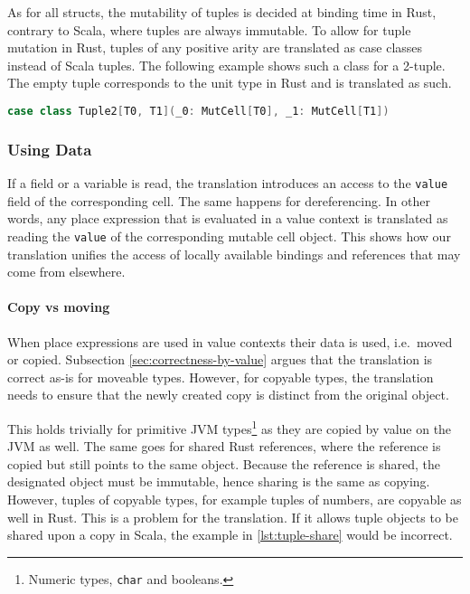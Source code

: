 As for all structs, the mutability of tuples is decided at binding time in Rust,
contrary to Scala, where tuples are always immutable. To allow for tuple
mutation in Rust, tuples of any positive arity are translated as case classes
instead of Scala tuples. The following example shows  such a class for a
2-tuple. The empty tuple corresponds to the unit type in Rust and is translated
as such.

\begin{lstlisting}[language=Scala, style=short]
case class Tuple2[T0, T1](_0: MutCell[T0], _1: MutCell[T1])
\end{lstlisting}

\subsubsection{Using Data}

If a field or a variable is read, the translation introduces an access to the
\passthrough{\lstinline!value!} field of the corresponding cell. The same
happens for dereferencing. In other words, any place expression that is
evaluated in a value context is translated as reading the
\passthrough{\lstinline!value!} of the corresponding mutable cell object. This
shows how our translation unifies the access of locally available bindings and
references that may come from elsewhere.

\paragraph{Copy vs moving}

When place expressions are used in value contexts their data is used, i.e.~moved
or copied. Subsection \ref{sec:correctness-by-value} argues that the translation
is correct as-is for moveable types. However, for copyable types, the
translation needs to ensure that the newly created copy is distinct from the
original object.

This holds trivially for primitive JVM types\footnote{Numeric types,
\lstinline!char! and booleans.} as they are copied by value on the JVM as well.
The same goes for shared Rust references, where the reference is copied but
still points to the same object. Because the reference is shared, the designated
object must be immutable, hence sharing is the same as copying. However, tuples
of copyable types, for example tuples of numbers, are copyable as well in Rust.
This is a problem for the translation. If it allows tuple objects to be shared
upon a copy in Scala, the example in \autoref{lst:tuple-share} would be
incorrect.

